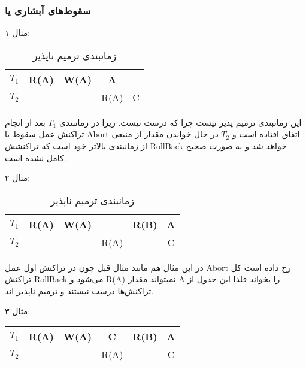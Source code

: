 \documentclass[a4paper]{article}
\begin{document}
\subsubsection{سقوط‌های آبشاری یا }

مثال ۱:

\begin{LTR}
    \begin{table}[h]
        \centering
        \begin{RTL}
            \caption{زمانبندی ترمیم ناپذیر}
        \end{RTL}
        \begin{tabular}{c|c|c|c|c}
            $T_{1}$ & R(A) & W(A) & A & \\ \hline
            $T_{2}$ & & & R(A) & C \\
        \end{tabular}
    \end{table}
\end{LTR}

این زمانبندی ترمیم پذیر نیست چرا که درست نیست. زیرا در زمانبندی $T_{1}$ بعد از
انجام تراکنش عمل سقوط یا Abort اتفاق افتاده است و $T_{2}$ در حال خواندن مقدار از
منبعی از زمانبندی بالاتر خود است که تراکنشش RollBack خواهد شد و به صورت صحیح
کامل نشده است.

\newpage

مثال ۲: 

\begin{LTR}
    \begin{table}[h]
        \centering
        \begin{RTL}
            \caption{زمانبندی ترمیم ناپذیر}
        \end{RTL}
        \begin{tabular}{c|c|c|c|c|c}
            $T_{1}$ & R(A) & W(A) & & R(B) & A \\ \hline
            $T_{2}$ & & & R(A) & & C \\
        \end{tabular}
    \end{table}
\end{LTR}

در این مثال هم مانند مثال قبل چون در تراکنش اول عمل Abort رخ داده است کل تراکنش
RollBack می‌شود و R(A) نمیتواند مقدار A را بخواند فلذا این جدول از تراکنش‌ها
درست نیستند و ترمیم ناپذیر اند.

مثال ۳:

\begin{LTR}
    \begin{table}[h]
        \centering
        \begin{tabular}{c|c|c|c|c|c}
            $T_{1}$ & R(A) & W(A) & C & R(B) & A \\ \hline
            $T_{2}$ & & & R(A) & & C \\
        \end{tabular}
    \end{table}
\end{LTR}
\end{document}
